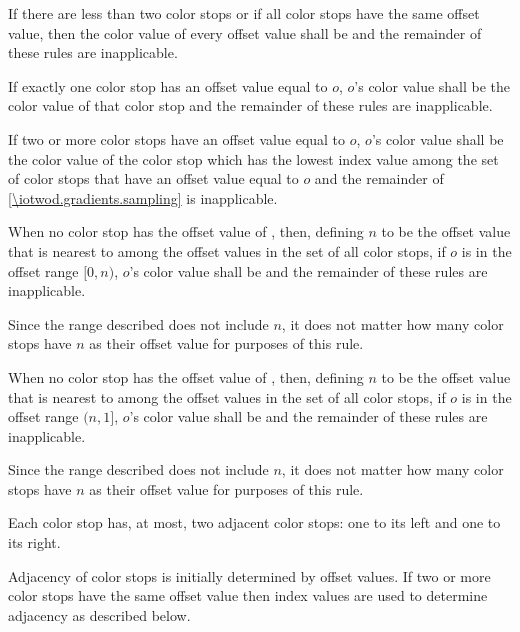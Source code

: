 \begin{enumeratea}
\item If there are less than two color stops or if all color stops have the same offset value, then the color value of every offset value shall be  and the remainder of these rules are inapplicable.

\item If exactly one color stop has an offset value equal to $o$, $o$'s color value shall be the color value of that color stop and the remainder of these rules are inapplicable.

\item If two or more color stops have an offset value equal to $o$, $o$'s color value shall be the color value of the color stop which has the lowest index value among the set of color stops that have an offset value equal to $o$ and the remainder of \ref{\iotwod.gradients.sampling} is inapplicable.

\item When no color stop has the offset value of , then, defining $n$ to be the offset value that is nearest to  among the offset values in the set of all color stops, if $o$ is in the offset range $[0, n)$, $o$'s color value shall be  and the remainder of these rules are inapplicable.
\begin{note}
Since the range described does not include $n$, it does not matter how many color stops have $n$ as their offset value for purposes of this rule.
\end{note}

\item When no color stop has the offset value of , then, defining $n$ to be the offset value that is nearest to  among the offset values in the set of all color stops, if $o$ is in the offset range $(n, 1]$, $o$'s color value shall be  and the remainder of these rules are inapplicable.
\begin{note}
Since the range described does not include $n$, it does not matter how many color stops have $n$ as their offset value for purposes of this rule.
\end{note}

\item Each color stop has, at most, two adjacent color stops: one to its left and one to its right.

\item Adjacency of color stops is initially determined by offset values. If two or more color stops have the same offset value then index values are used to determine adjacency as described below.


\end{enumeratea}

